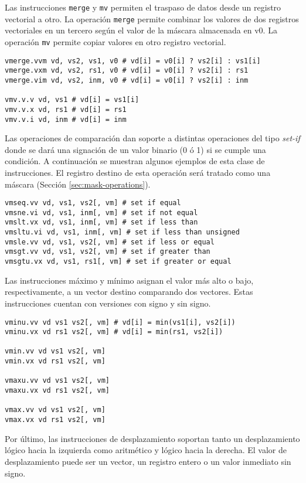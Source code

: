 Las instrucciones \texttt{merge} y \texttt{mv} permiten el traspaso de datos
desde un registro vectorial a otro.  La operación \texttt{merge} permite
combinar los valores de dos registros vectoriales en un tercero según el valor
de la máscara almacenada en v0. La operación \texttt{mv} permite copiar valores
en otro registro vectorial.

\begin{lstlisting}
vmerge.vvm vd, vs2, vs1, v0 # vd[i] = v0[i] ? vs2[i] : vs1[i]
vmerge.vxm vd, vs2, rs1, v0 # vd[i] = v0[i] ? vs2[i] : rs1
vmerge.vim vd, vs2, inm, v0 # vd[i] = v0[i] ? vs2[i] : inm

vmv.v.v vd, vs1 # vd[i] = vs1[i]
vmv.v.x vd, rs1 # vd[i] = rs1
vmv.v.i vd, inm # vd[i] = inm
\end{lstlisting}

Las operaciones de comparación dan soporte a distintas operaciones del tipo
\textit{set-if} donde se dará una signación de un valor binario (0 ó 1) si se
cumple una condición. A continuación se muestran algunos ejemplos de esta clase
de instrucciones. El registro destino de esta operación será tratado como una
máscara (Sección \ref{sec:mask-operations}).

\begin{lstlisting}
vmseq.vv vd, vs1, vs2[, vm] # set if equal
vmsne.vi vd, vs1, inm[, vm] # set if not equal
vmslt.vx vd, vs1, inm[, vm] # set if less than
vmsltu.vi vd, vs1, inm[, vm] # set if less than unsigned
vmsle.vv vd, vs1, vs2[, vm] # set if less or equal
vmsgt.vv vd, vs1, vs2[, vm] # set if greater than
vmsgtu.vx vd, vs1, rs1[, vm] # set if greater or equal
\end{lstlisting}

Las instrucciones máximo y mínimo asignan el valor más alto o bajo,
respectivamente, a un vector destino comparando dos vectores. Estas
instrucciones cuentan con versiones con signo y sin signo.

\begin{lstlisting}
vminu.vv vd vs1 vs2[, vm] # vd[i] = min(vs1[i], vs2[i])
vminu.vx vd rs1 vs2[, vm] # vd[i] = min(rs1, vs2[i])

vmin.vv vd vs1 vs2[, vm]
vmin.vx vd rs1 vs2[, vm]

vmaxu.vv vd vs1 vs2[, vm]
vmaxu.vx vd rs1 vs2[, vm]

vmax.vv vd vs1 vs2[, vm]
vmax.vx vd rs1 vs2[, vm]
\end{lstlisting}

Por último, las instrucciones de desplazamiento soportan tanto un
desplazamiento lógico hacia la izquierda como aritmético y lógico hacia la
derecha. El valor de desplazamiento puede ser un
vector, un registro entero o un valor inmediato sin signo.


